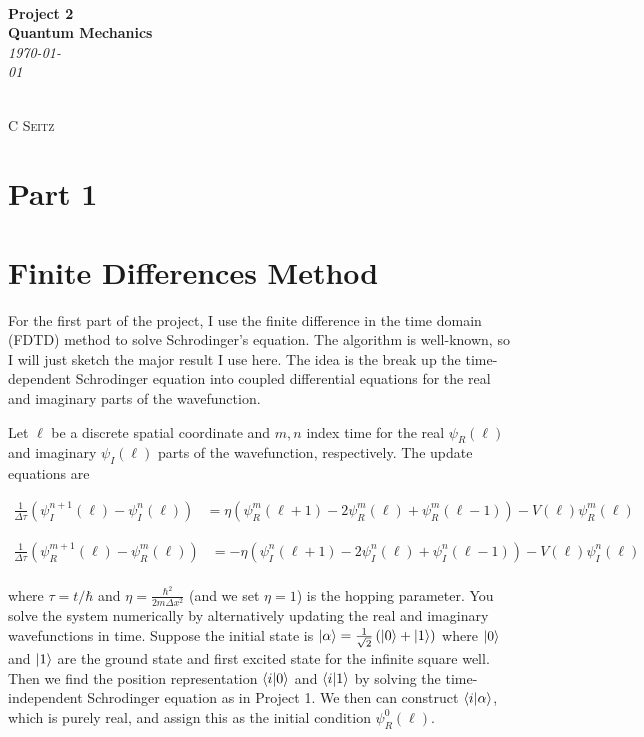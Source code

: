 \documentclass[12pt]{article}
\theoremstyle{definition}
\begin{document}
 {\noindent\Huge\bf  \\[0.5\baselineskip] {\selectfont  Project 2}         }\\[2\baselineskip] %
{ {\bf {}\selectfont Quantum Mechanics}\\ {\textit{\selectfont     \today}}}~~~~~~~~~~~~~~~~~~~~~~~~~~~~~~~~~~~~~~~~~~~~~~~~~~~~~~~~~~~~~~~~~~~~~~~~~~~~~    
{\large \textsc{C Seitz}
\\[1.4\baselineskip] 


\section{Part 1}


\section{Finite Differences Method}

For the first part of the project, I use the finite difference in the time domain (FDTD) method to solve Schrodinger's equation. The algorithm is well-known, so I will just sketch the major result I use here. The idea is the break up the time-dependent Schrodinger equation into coupled differential equations for the real and imaginary parts of the wavefunction. 

Let $\ell$ be a discrete spatial coordinate and $m,n$ index time for the real $\psi_{R}(\ell)$ and imaginary $\psi_{I}(\ell)$ parts of the wavefunction, respectively. The update equations are

\begin{align*}
\frac{1}{\Delta \tau}\left(\psi_{I}^{n+1}(\ell)-\psi_{I}^{n}(\ell)\right) &= \eta\left(\psi_{R}^{m}(\ell + 1) - 2\psi_{R}^{m}(\ell)+ \psi_{R}^{m}(\ell -1 )\right) - V(\ell)\psi_{R}^{m}(\ell)
\end{align*}

\begin{align*}
\frac{1}{\Delta \tau}\left(\psi_{R}^{m+1}(\ell)-\psi_{R}^{m}(\ell)\right) &= -\eta\left(\psi_{I}^{n}(\ell + 1) - 2\psi_{I}^{n}(\ell)+ \psi_{I}^{n}(\ell -1 )\right) - V(\ell)\psi_{I}^{n}(\ell)\\
\end{align*}

where $\tau = t/\hbar$ and $\eta = \frac{\hbar^{2}}{2m\Delta x^{2}}$ (and we set $\eta=1$) is the hopping parameter. You solve the system numerically by alternatively updating the real and imaginary wavefunctions in time. Suppose the initial state is $\ket{\alpha} = \frac{1}{\sqrt{2}}\left(\ket{0} + \ket{1}\right)$ where $\ket{0}$ and $\ket{1}$ are the ground state and first excited state for the infinite square well. Then we find the position representation $\bra{i}\ket{0}$ and $\bra{i}\ket{1}$ by solving the time-independent Schrodinger equation as in Project 1. We then can construct $\bra{i}\ket{\alpha}$, which is purely real, and assign this as the initial condition $\psi_{R}^{0}(\ell)$.

}
\end{document}

